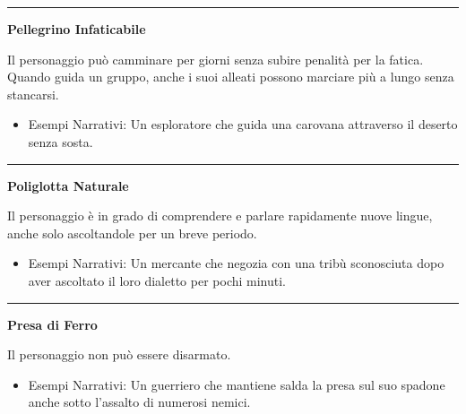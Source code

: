 \documentclass[../manuale_main.tex]{subfiles}
\begin{document}
\vspace{0.5cm}
\noindent
\begin{center}
\rule{\textwidth}{0.4pt} 
\end{center}
\vspace{0.5cm}

\begin{center}
\textbf{\large{Pellegrino Infaticabile}}\\
\end{center}
Il personaggio può camminare per giorni senza subire penalità per la fatica. Quando guida un gruppo, anche i suoi alleati possono marciare più a lungo senza stancarsi.

\begin{itemize}
\item Esempi Narrativi: Un esploratore che guida una carovana attraverso il deserto senza sosta.
\end{itemize}

\vspace{0.5cm}
\noindent
\begin{center}
\rule{\textwidth}{0.4pt} 
\end{center}
\vspace{0.5cm}

\begin{center}
\textbf{\large{Poliglotta Naturale}}\\
\end{center}
Il personaggio è in grado di comprendere e parlare rapidamente nuove lingue, anche solo ascoltandole per un breve periodo.

\begin{itemize}
\item Esempi Narrativi: Un mercante che negozia con una tribù sconosciuta dopo aver ascoltato il loro dialetto per pochi minuti.
\end{itemize}

\vspace{0.5cm}
\noindent
\begin{center}
\rule{\textwidth}{0.4pt} 
\end{center}
\vspace{0.5cm}

\begin{center}
\textbf{\large{Presa di Ferro}}\\
\end{center}
Il personaggio non può essere disarmato.

\begin{itemize}
\item Esempi Narrativi: Un guerriero che mantiene salda la presa sul suo spadone anche sotto l'assalto di numerosi nemici.
\end{itemize}
\end{document}
